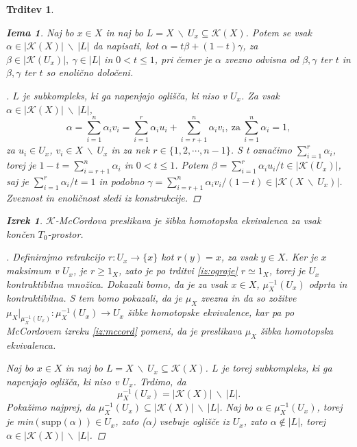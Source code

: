 \documentclass[a4paper,12pt]{article}
\DeclareRobustCommand{\k}{
    \mathcal{K}
}
\theoremstyle{definition}
\theoremstyle{plain}
\newtheorem{izrek}{Izrek}
\theoremstyle{definition}
\theoremstyle{plain}
\newtheorem{trditev}{Trditev}
\theoremstyle{plain}
\theoremstyle{plain}
\theoremstyle{plain}
\newtheorem{lema}{Iema}
\newenvironment{dokaz}{\begin{proof}[\bfseries\upshape\proofname]}{\end{proof}}
\begin{document}
\begin{trditev}
\begin{lema}\label{lem:sibka}
    Naj bo $x\in X$ in naj bo $L=X\ \backslash \
    U_x\subseteq \mathcal{K}(X)$. Potem se vsak $\alpha \in |\k(X)|\ \backslash \ |L|$ da napisati, kot $\alpha = t\beta + (1-t)\gamma$, za $\beta \in |\k(U_x)|, \ \gamma \in |L|$ in $0<t\leq 1$, pri čemer je $\alpha$ zvezno odvisna od $\beta, \gamma$ ter $t$ in $\beta, \gamma$ ter $t$ so enolično določeni.
\end{lema}
\begin{dokaz}
    $L$ je subkompleks, ki ga napenjajo oglišča, ki niso v $U_x$. Za vsak $\alpha \in |\k(X)|\ \backslash \ |L|$, 
    $$\alpha = \sum_{i=1}^{n} \alpha_i v_i 
    = \sum_{i=1}^{r} \alpha_i u_i + \sum_{i=r+1}^{n}\alpha_i v_i,\ \text{za}\ \sum_{i=1}^{n} \alpha_i=1,
    $$
    za $u_i \in U_x$, $v_i \in X \ \backslash \ U_x$ in za nek $r\in \{1,2, \cdots, n-1\}$. S t označimo $\sum_{i=1}^{r} \alpha_i$, torej je $1-t=\sum_{i=r+1}^{n} \alpha_i$ in $0<t\leq 1$. Potem $\beta =\sum_{i=1}^{r} \alpha_i u_i/t \in |\k(U_x)|$, saj je $\sum_{i=1}^{r} \alpha_i/t=1$ in podobno $\gamma=\sum_{i=r+1}^{n} 
    \alpha_i v_i/(1-t) \in |\k(X \ \backslash \ U_x)|$. Zveznost in enoličnost sledi iz konstrukcije.

\end{dokaz}

\begin{izrek}
    $\mathcal{K}$-\textit{McCordova} preslikava je šibka homotopska 
    ekvivalenca za vsak končen $T_0$-prostor.
\end{izrek}

\begin{dokaz}
    Definirajmo retrakcijo $r:U_x\rightarrow \{x\}$ kot 
    $r(y)=x$, za vsak $y\in X$. Ker je $x$ maksimum v 
    $U_x$, je $r\geq 1_X$, zato je po trditvi 
    \ref{iz:ograje} $r\simeq 1_X$, torej je $U_x$ 
    kontraktibilna množica. Dokazali bomo, da je za vsak 
    $x\in X$, $\mu_X^{-1}(U_x)$ odprta in kontraktibilna. S 
    tem bomo pokazali, da je $\mu_X$ zvezna in da so 
    zožitve $\mu_X|_{\mu_X^{-1}(U_x)}:\mu_X^{-1}(U_x)\rightarrow 
    U_x$ šibke homotopske ekvivalence, kar pa po McCordovem izreku \ref*{iz:mccord}
    pomeni, da je preslikava $\mu_X$ šibka homotopska ekvivalenca.

    Naj bo $x\in X$ in naj bo $L=X\ \backslash \
    U_x\subseteq \mathcal{K}(X)$. $L$ je torej 
    subkompleks, ki ga napenjajo oglišča, ki niso v $U_x$. 
    Trdimo, da 
    $$
    \mu_X^{-1}(U_x)=|\mathcal{K}(X)|\ \backslash \ |L|.
    $$
    Pokažimo najprej, da $\mu_X^{-1}(U_x)\subseteq 
    |\mathcal{K}(X)|\ \backslash \ |L|$. Naj bo $\alpha \in 
    \mu_X^{-1}(U_x)$, torej je min$(\text{supp}
    (\alpha))\in U_x$, zato \text{supp}($\alpha$) vsebuje 
    oglišče iz $U_x$, zato $\alpha \notin |L|$, torej $\alpha 
    \in |\mathcal{K}(X)|\ \backslash \ |L|$.


\end{dokaz}
\end{trditev}
\end{document}
